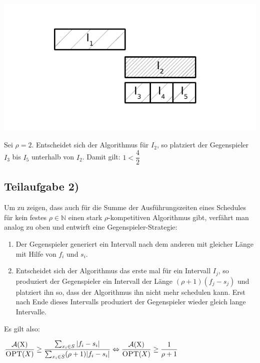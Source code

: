 \documentclass[a4paper, fontsize=10pt]{scrartcl}
\begin{document}
  \begin{center}
    \includegraphics[scale=0.7]{aufgabe1a.pdf}
  \end{center}
  
Sei $\rho=2$. Entscheidet sich der Algorithmus für $I_2$, so platziert der Gegenspieler $I_3$ bis $I_5$ unterhalb von $I_2$. Damit gilt:
$1<\dfrac{4}{2}$


\subsection*{Teilaufgabe 2)}

Um zu zeigen, dass auch für die Summe der Ausführungszeiten eines Schedules für kein festes $\rho \in \mathbb{N}$ einen stark $\rho$-kompetitiven Algorithmus gibt, verfährt man analog zu oben und entwirft eine Gegenspieler-Strategie:
\begin{enumerate}
  \item Der Gegenspieler generiert ein Intervall nach dem anderen mit gleicher Länge mit Hilfe von $f_i$ und $s_i$.
  \item Entscheidet sich der Algorithmus das erste mal für ein Intervall $I_j$, so produziert der Gegenspieler ein Intervall der Länge $(\rho +1)(f_j-s_j)$ und platziert ihn so, dass der Algorithmus ihn nicht mehr schedulen kann. Erst nach Ende dieses Intervalls produziert der Gegenspieler wieder gleich lange Intervalle. 
\end{enumerate}\smallskip

Es gilt also:\smallskip
  \begin{center}
  $ \dfrac{ \cal{A}\textrm{(X)}}{\textsc{OPT}(X)}\geq \dfrac{\sum\nolimits_{x_i\in S}|f_i-s_i|}{\sum\nolimits_{x_i\in S}(\rho+1)|f_i-s_i|}  \Leftrightarrow  \dfrac{\cal{A}\textrm{(X)}}{\textsc{OPT}(X)} \geq \dfrac{1}{\rho +1 }$

  \end{center}
\smallskip
\end{document}
